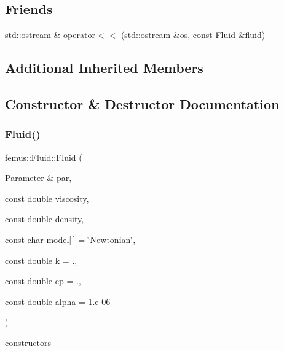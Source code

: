 \subsection*{Friends}
\begin{DoxyCompactItemize}
\item 
std\+::ostream \& \mbox{\hyperlink{classfemus_1_1_fluid_a29fca4de20408057a55a836385cb66ed}{operator$<$$<$}} (std\+::ostream \&os, const \mbox{\hyperlink{classfemus_1_1_fluid}{Fluid}} \&fluid)
\end{DoxyCompactItemize}
\subsection*{Additional Inherited Members}


\subsection{Constructor \& Destructor Documentation}
\mbox{\label{classfemus_1_1_fluid_a8d1831919f5338cfd229ae987f999907}} 
\subsubsection{\texorpdfstring{Fluid()}{Fluid()}\hspace{0.1cm}{\footnotesize\ttfamily [1/3]}}
{\footnotesize\ttfamily femus\+::\+Fluid\+::\+Fluid (\begin{DoxyParamCaption}\item[{\mbox{\hyperlink{classfemus_1_1_parameter}{Parameter}} \&}]{par,  }\item[{const double}]{viscosity,  }\item[{const double}]{density,  }\item[{const char}]{model\mbox{[}$\,$\mbox{]} = {\ttfamily \char`\"{}Newtonian\char`\"{}},  }\item[{const double}]{k = {.},  }\item[{const double}]{cp = {.},  }\item[{const double}]{alpha = {\ttfamily 1.e-\/06} }\end{DoxyParamCaption})}

constructors \mbox{\label{classfemus_1_1_fluid_a052d4f2d1abfd8a570e61c1447329f7c}} 
